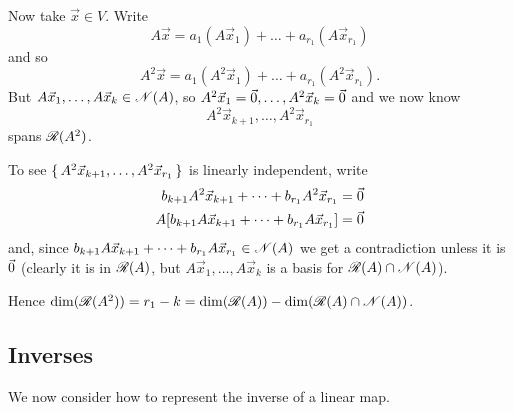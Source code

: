 \begin{exercises}
\begin{answer}
      Now take \( \vec{x}\in V \).
      Write
      \begin{equation*}
        A\vec{x}=a_1(A\vec{x}_1)+\dots+a_{r_1}(A\vec{x}_{r_1})
      \end{equation*}
      and so
      \begin{equation*}
        A^2\vec{x}=a_1(A^2\vec{x}_1)+\dots+a_{r_1}(A^2\vec{x}_{r_1}).
      \end{equation*}
      But \( A\vec{x}_1,\dots,A\vec{x}_k\in\mathscr{N}(A) \), so
      \( A^2\vec{x}_1=\vec{0},\dots,A^2\vec{x}_k=\vec{0} \) and we now know
      \begin{equation*}
        A^2\vec{x}_{k+1},\dots,A^2\vec{x}_{r_1}
      \end{equation*}
      spans \( \mathscr{R}(A^2) \).

      To see \( \mbox{$\{\,A^2\vec{x}_{k+1},\dots,A^2\vec{x}_{r_1}\,\}$} \)
      is linearly independent, write
      \begin{align*}
        b_{k+1}A^2\vec{x}_{k+1}+\dots+b_{r_1}A^2\vec{x}_{r_1}
        &=\vec{0}                                                 \\
        A[b_{k+1}A\vec{x}_{k+1}+\dots+b_{r_1}A\vec{x}_{r_1}]
        &=\vec{0}
      \end{align*}
      and, since
      \( b_{k+1}A\vec{x}_{k+1}+\dots+b_{r_1}A\vec{x}_{r_1}\in\mathscr{N}(A) \)
      we get a contradiction unless it is \( \vec{0} \) (clearly it is in
      \( \mathscr{R}(A) \), but \( A\vec{x}_1,\ldots,A\vec{x}_k \) is a basis
      for \( \mathscr{R}(A)\cap\mathscr{N}(A) \)).

      Hence \( \dim(\mathscr{R}(A^2))=r_1-k=\dim(\mathscr{R}(A))-
                \dim(\mathscr{R}(A)\cap\mathscr{N}(A)) \).  
    \end{answer}
\end{exercises}























\subsection{Inverses}
We now consider how to represent the 
inverse of a linear map.

